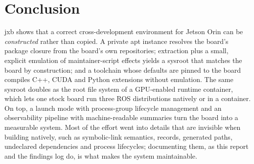 \documentclass[11pt,a4paper]{article}
\newcommand{\jxb}{\textsf{jxb}}
\begin{document}
\section{Conclusion}
\jxb{} shows that a correct cross-development environment for Jetson Orin can be \emph{constructed} rather than copied.
A private apt instance resolves the board's package closure from the board's own repositories; extraction plus a small,
explicit emulation of maintainer-script effects yields a sysroot that matches the board by construction; and a toolchain
whose defaults are pinned to the board compiles C++, CUDA and Python extensions without emulation. The same sysroot
doubles as the root file system of a GPU-enabled runtime container, which lets one stock board run three ROS
distributions natively or in a container. On top, a launch mode with process-group lifecycle management and an
observability pipeline with machine-readable summaries turn the board into a measurable system. Most of the effort went
into details that are invisible when building natively, such as symbolic-link semantics,  records,
generated paths, undeclared dependencies and process lifecycles; documenting them, as this report and the findings log
do, is what makes the system maintainable.

\appendix
\end{document}
